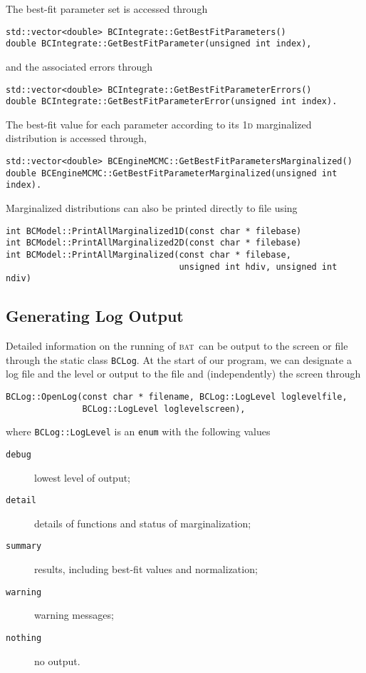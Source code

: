 \documentclass[a4paper,11pt]{article}
\newcommand{\acronym}[1]{\textsc{#1}}
\newcommand{\BAT}{\acronym{bat}}
\newcommand{\xD}[1]{#1\textsc{d}}
\newcommand{\Icode}[1]{\texttt{#1}}
\begin{document}
The best-fit parameter set is accessed through
\begin{verbatim}
std::vector<double> BCIntegrate::GetBestFitParameters()
double BCIntegrate::GetBestFitParameter(unsigned int index),
\end{verbatim}
and the associated errors through
\begin{verbatim}
std::vector<double> BCIntegrate::GetBestFitParameterErrors()
double BCIntegrate::GetBestFitParameterError(unsigned int index).
\end{verbatim}
The best-fit value for each parameter according to its \xD{1}
marginalized distribution is accessed through,
\begin{verbatim}
std::vector<double> BCEngineMCMC::GetBestFitParametersMarginalized()
double BCEngineMCMC::GetBestFitParameterMarginalized(unsigned int index).
\end{verbatim}

Marginalized distributions can also be printed directly to file using
\begin{verbatim}
int BCModel::PrintAllMarginalized1D(const char * filebase)
int BCModel::PrintAllMarginalized2D(const char * filebase)
int BCModel::PrintAllMarginalized(const char * filebase,
                                  unsigned int hdiv, unsigned int ndiv)
\end{verbatim}

\subsection{Generating Log Output}

Detailed information on the running of \BAT\ can be output to the
screen or file through the static class \Icode{BCLog}. At the start of
our program, we can designate a log file and the level or output to
the file and (independently) the screen through
\begin{verbatim}
BCLog::OpenLog(const char * filename, BCLog::LogLevel loglevelfile,
               BCLog::LogLevel loglevelscreen),
\end{verbatim}
where \Icode{BCLog::LogLevel} is an \Icode{enum} with the following values
\begin{description}
\item[\quad\Icode{debug}] lowest level of output;
\item[\quad\Icode{detail}] details of functions and status of marginalization;
\item[\quad\Icode{summary}] results, including best-fit values and normalization;
\item[\quad\Icode{warning}] warning messages;
\item[\quad\Icode{nothing}] no output.
\end{description}
\end{document}

